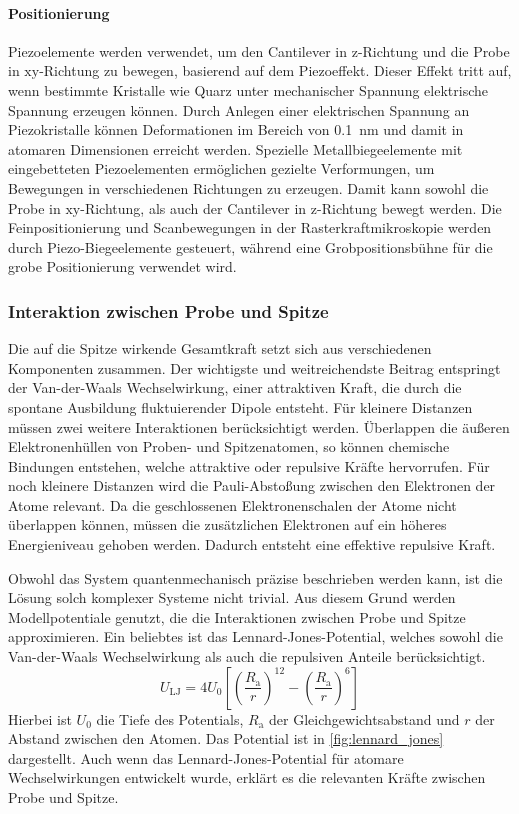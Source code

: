 \paragraph{Positionierung}
Piezoelemente werden verwendet, um den Cantilever in $\mathrm{z}$-Richtung und die Probe in $\mathrm{xy}$-Richtung zu
bewegen, basierend auf dem Piezoeffekt.
Dieser Effekt tritt auf, wenn bestimmte Kristalle wie Quarz unter mechanischer Spannung elektrische Spannung erzeugen
können.
Durch Anlegen einer elektrischen Spannung an Piezokristalle können Deformationen im Bereich von \qty{0.1}{\nano\meter}
und damit in atomaren Dimensionen erreicht werden.
Spezielle Metallbiegeelemente mit eingebetteten Piezoelementen ermöglichen gezielte Verformungen, um Bewegungen
in verschiedenen Richtungen zu erzeugen.
Damit kann sowohl die Probe in $\mathrm{xy}$-Richtung, als auch der Cantilever in $\mathrm{z}$-Richtung bewegt werden.
Die Feinpositionierung und Scanbewegungen in der Rasterkraftmikroskopie werden durch Piezo-Biegeelemente gesteuert,
während eine Grobpositionsbühne für die grobe Positionierung verwendet wird.

\subsubsection{Interaktion zwischen Probe und Spitze}
Die auf die Spitze wirkende Gesamtkraft setzt sich aus verschiedenen Komponenten zusammen.
Der wichtigste und weitreichendste Beitrag entspringt der Van-der-Waals Wechselwirkung, einer attraktiven Kraft,
die durch die spontane Ausbildung fluktuierender Dipole entsteht.
Für kleinere Distanzen müssen zwei weitere Interaktionen berücksichtigt werden.
Überlappen die äußeren Elektronenhüllen von Proben- und Spitzenatomen, so können chemische Bindungen entstehen, welche
attraktive oder repulsive Kräfte hervorrufen.
Für noch kleinere Distanzen wird die Pauli-Abstoßung zwischen den Elektronen der Atome relevant.
Da die geschlossenen Elektronenschalen der Atome nicht überlappen können, müssen die zusätzlichen Elektronen auf ein
höheres Energieniveau gehoben werden.
Dadurch entsteht eine effektive repulsive Kraft.

Obwohl das System quantenmechanisch präzise beschrieben werden kann, ist die Lösung solch komplexer Systeme
nicht trivial.
Aus diesem Grund werden Modellpotentiale genutzt, die die Interaktionen zwischen Probe und Spitze approximieren.
Ein beliebtes ist das Lennard-Jones-Potential, welches sowohl die Van-der-Waals Wechselwirkung als auch die repulsiven
Anteile berücksichtigt.
\begin{equation*}
    U_{\mathrm{LJ}}=4U_{0}\left[ \left( \frac{R_{\mathrm{a}}}{r} \right)^{12} -\left( \frac{R_{\mathrm{a}}}{r}
    \right)^{6}\right]
\end{equation*}
Hierbei ist $U_{0}$ die Tiefe des Potentials, $R_{\mathrm{a}}$ der Gleichgewichtsabstand und $r$ der Abstand zwischen
den Atomen.
Das Potential ist in \cref{fig:lennard_jones} dargestellt.
Auch wenn das Lennard-Jones-Potential für atomare Wechselwirkungen entwickelt wurde, erklärt es die relevanten
Kräfte zwischen Probe und Spitze.

